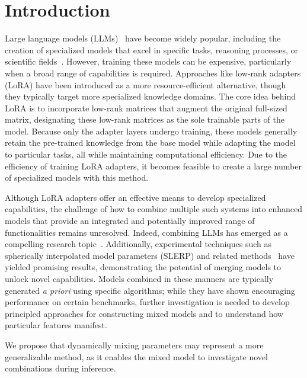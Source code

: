 \section{Introduction}
Large language models (LLMs)~\cite{Vaswani2017AttentionNeedc,Touvron2023LlamaModels,OpenAI2023GPT-4Report,Chowdhery2022PaLM:Pathways,Jiang2023Mistral7B,Gunasekar2023TextbooksNeed} have become widely popular, including the creation of specialized models that excel in specific tasks, reasoning processes, or scientific fields~\cite{Bubeck2023SparksGPT-4,Buehler2023MechGPTModalities,Nejjar2023LLMsAnalysis,Buehler2023GenerativeDesign,Luu2023BioinspiredLLM:Materials,Luu2023GenerativeSolvents,Buehler2023MeLMProblemsb,Ge2023OpenAGI:Experts}. However, training these models can be expensive, particularly when a broad range of capabilities is required. Approaches like low-rank adapters (LoRA) \cite{hu2021lora} have been introduced as a more resource-efficient alternative, though they typically target more specialized knowledge domains. The core idea behind LoRA is to incorporate low-rank matrices that augment the original full-sized matrix, designating these low-rank matrices as the sole trainable parts of the model. Because only the adapter layers undergo training, these models generally retain the pre-trained knowledge from the base model while adapting the model to particular tasks, all while maintaining computational efficiency. Due to the efficiency of training LoRA adapters, it becomes feasible to create a large number of specialized models with this method.

Although LoRA adapters offer an effective means to develop specialized capabilities, the challenge of how to combine multiple such systems into enhanced models that provide an integrated and potentially improved range of functionalities remains unresolved. Indeed, combining LLMs has emerged as a compelling research topic~\cite{Kim2023SOLARUp-Scaling}. Additionally, experimental techniques such as spherically interpolated model parameters (SLERP) and related methods~\cite{Arcee-ai/mergekit:Models.} have yielded promising results, demonstrating the potential of merging models to unlock novel capabilities. Models combined in these manners are typically generated {\it a priori} using specific algorithms; while they have shown encouraging performance on certain benchmarks, further investigation is needed to develop principled approaches for constructing mixed models and to understand how particular features manifest.

We propose that dynamically mixing parameters may represent a more generalizable method, as it enables the mixed model to investigate novel combinations during inference.


